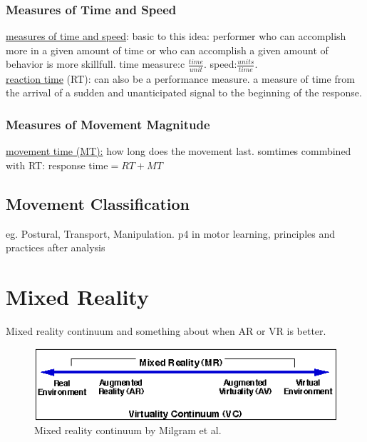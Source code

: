 \subsubsection{Measures of Time and Speed}
\underline{measures of time and speed}: basic to this idea: performer who can accomplish more in a given amount of time or who can accomplish a given amount of behavior is  more skillfull. time measure:c $\frac{time}{unit}$. speed:$\frac{units}{time}$.\\

\underline{reaction time} (RT): can also be a performance measure. a measure of time from the arrival of a sudden and unanticipated signal to the beginning of the response. 
\subsubsection{Measures of Movement Magnitude}
\underline{movement time (MT):} how long does the movement last. somtimes commbined with RT: response time$=RT+MT$

\subsection{Movement Classification}
eg. Postural, Transport, Manipulation. p4 in motor learning, principles and practices
\todo after analysis

\section{Mixed Reality}
Mixed reality continuum \cite{Milgram1994} and something about when AR or VR is better. \todo

\begin{figure}
	\centering
	\includegraphics[width=1.0\textwidth]{img/milgram_continuum.png}
	\caption{Mixed reality continuum by Milgram et al. \cite{Milgram1994}}
	\label{fig:ego-exo-cont}
\end{figure}

